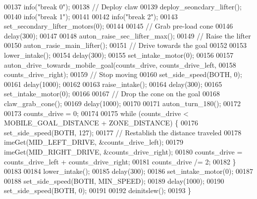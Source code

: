 \begin{DoxyCode}
00137   info(\textcolor{stringliteral}{"break 0"});
00138   \textcolor{comment}{// Deploy claw}
00139   deploy_seoncdary_lifter();
00140   info(\textcolor{stringliteral}{"break 1"});
00141 
00142   info(\textcolor{stringliteral}{"break 2"});
00143   set_secondary_lifter_motors(0);
00144 
00145   \textcolor{comment}{// Grab pre-load cone}
00146   delay(300);
00147 
00148   auton_raise_sec_lifter_max();
00149   \textcolor{comment}{// Raise the lifter}
00150   auton_rasie_main_lifter();
00151   \textcolor{comment}{// Drive towards the goal}
00152 
00153   lower_intake();
00154   delay(300);
00155   set_intake_motor(0);
00156 
00157   auton_drive_towards_mobile_goal(counts\_drive, counts\_drive\_left,
00158                                   counts\_drive\_right);
00159   \textcolor{comment}{// Stop moving}
00160   set_side_speed(BOTH, 0);
00161   delay(1000);
00162 
00163   raise_intake();
00164   delay(300);
00165   set_intake_motor(0);
00166 
00167   \textcolor{comment}{// Drop the cone on the goal}
00168   claw_grab_cone();
00169   delay(1000);
00170 
00171   auton_turn_180();
00172 
00173   counts\_drive = 0;
00174 
00175   \textcolor{keywordflow}{while} (counts\_drive < MOBILE\_GOAL\_DISTANCE + ZONE\_DISTANCE) \{
00176     set_side_speed(BOTH, 127);
00177     \textcolor{comment}{// Restablish the distance traveled}
00178     imeGet(MID\_LEFT\_DRIVE, &counts\_drive\_left);
00179     imeGet(MID\_RIGHT\_DRIVE, &counts\_drive\_right);
00180     counts\_drive = counts\_drive\_left + counts\_drive\_right;
00181     counts\_drive /= 2;
00182   \}
00183 
00184   lower_intake();
00185   delay(300);
00186   set_intake_motor(0);
00187 
00188   set_side_speed(BOTH, MIN\_SPEED);
00189   delay(1000);
00190   set_side_speed(BOTH, 0);
00191 
00192   deinitslew();
00193 \}
\end{DoxyCode}
